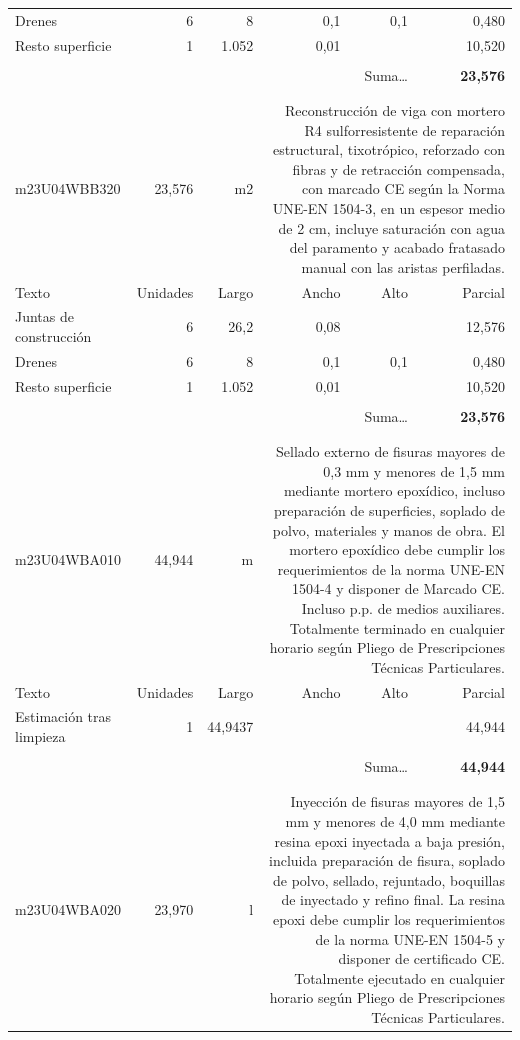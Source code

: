 \documentclass{book}%
\begin{document}
\begin{longtable}{lrrrrr}
\multicolumn{1}{p{3.5cm}}{Drenes}&6&8&0,1&0,1&     0,480\\%
\multicolumn{1}{p{3.5cm}}{Resto superficie}&1&1.052&0,01&&    10,520\\%
&&&&&\\%
\multicolumn{5}{r}{Suma\ldots}&\textbf{    23,576}\\%
\hline%
&&&&&\\%
&&&&&\\%
m23U04WBB320&    23,576& m2&\multicolumn{3}{p{6cm}}{\scriptsize Reconstrucción de viga con mortero R4 sulforresistente de reparación estructural, tixotrópico, reforzado con fibras y de retracción compensada, con marcado CE según la Norma UNE-EN 1504-3, en un espesor medio de 2 cm, incluye saturación con agua del paramento y acabado fratasado manual con las aristas perfiladas.\normalsize}\\%
Texto&Unidades&Largo&Ancho&Alto&Parcial\\%
\hline%
\multicolumn{1}{p{3.5cm}}{Juntas de construcción}&6&26,2&0,08&&    12,576\\%
\multicolumn{1}{p{3.5cm}}{Drenes}&6&8&0,1&0,1&     0,480\\%
\multicolumn{1}{p{3.5cm}}{Resto superficie}&1&1.052&0,01&&    10,520\\%
&&&&&\\%
\multicolumn{5}{r}{Suma\ldots}&\textbf{    23,576}\\%
\hline%
&&&&&\\%
&&&&&\\%
m23U04WBA010&    44,944& m&\multicolumn{3}{p{6cm}}{\scriptsize Sellado externo de fisuras mayores de 0,3 mm y menores de 1,5 mm mediante mortero epoxídico, incluso preparación de superficies, soplado de polvo, materiales y manos de obra. El mortero epoxídico debe cumplir los requerimientos de la norma UNE-EN 1504-4 y disponer de Marcado CE. Incluso p.p. de medios auxiliares. Totalmente terminado en cualquier horario según Pliego de Prescripciones Técnicas Particulares.\normalsize}\\%
Texto&Unidades&Largo&Ancho&Alto&Parcial\\%
\hline%
\multicolumn{1}{p{3.5cm}}{Estimación tras limpieza}&1&44,9437&&&    44,944\\%
&&&&&\\%
\multicolumn{5}{r}{Suma\ldots}&\textbf{    44,944}\\%
\hline%
&&&&&\\%
&&&&&\\%
m23U04WBA020&    23,970& l&\multicolumn{3}{p{6cm}}{\scriptsize Inyección de fisuras mayores de 1,5 mm y menores de 4,0 mm mediante resina epoxi inyectada a baja presión, incluida preparación de fisura, soplado de polvo, sellado, rejuntado, boquillas de inyectado y refino final. La resina epoxi debe cumplir los requerimientos de la norma UNE-EN 1504-5 y disponer de certificado CE. Totalmente ejecutado en cualquier horario según Pliego de Prescripciones Técnicas Particulares.\normalsize}\\%

\end{longtable}
\end{document}
